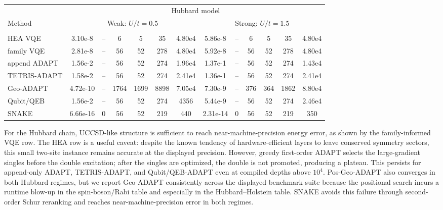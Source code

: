 \documentclass[
  reprint,
  amsmath,
  amssymb,
  aps,
  pra,
  nofootinbib,
  superscriptaddress,
  floatfix
]{revtex4-2}
\newcommand{\metrichead}[1]{\makebox[0.061\textwidth][c]{#1}}
\begin{document}
\begin{widetext}
\begin{minipage}{\textwidth}
\begin{center}
\footnotesize
\setlength{\tabcolsep}{1.15pt}
\renewcommand{\arraystretch}{1.08}
\begin{ruledtabular}
\begin{tabular}{p{}cccccc|cccccc}
& \multicolumn{12}{c}{Hubbard model}\\
\cline{2-13}
Method & \multicolumn{6}{c|}{Weak: $U/t=0.5$} & \multicolumn{6}{c}{Strong: $U/t=1.5$}\\
\cline{2-7}\cline{8-13}
 & \metrichead{$|\Delta E|$} & \metrichead{$1-F$} & \metrichead{$N_{2q}$} & \metrichead{$D_{2q}$} & \metrichead{$D_c$} & \metrichead{$S$} & \metrichead{$|\Delta E|$} & \metrichead{$1-F$} & \metrichead{$N_{2q}$} & \metrichead{$D_{2q}$} & \metrichead{$D_c$} & \metrichead{$S$}\\
\colrule
HEA VQE & 3.10e-8 & -- & 6 & 5 & 35 & 4.80e4 & 5.86e-8 & -- & 6 & 5 & 35 & 4.80e4\\
family VQE & 2.81e-8 & -- & 56 & 52 & 278 & 4.80e4 & 5.92e-8 & -- & 56 & 52 & 278 & 4.80e4\\
append ADAPT & 1.56e-2 & -- & 56 & 52 & 274 & 1.96e4 & 1.37e-1 & -- & 56 & 52 & 274 & 1.43e4\\
TETRIS-ADAPT & 1.58e-2 & -- & 56 & 52 & 274 & 2.41e4 & 1.36e-1 & -- & 56 & 52 & 274 & 2.41e4\\
Geo-ADAPT & 4.72e-10 & -- & 1764 & 1699 & 8898 & 7.05e4 & 7.30e-9 & -- & 376 & 364 & 1862 & 8.80e4\\
Qubit/QEB & 1.56e-2 & -- & 56 & 52 & 274 & 4356 & 5.44e-9 & -- & 56 & 52 & 274 & 2.46e4\\
SNAKE & 6.66e-16 & 0 & 56 & 52 & 219 & 440 & 2.31e-14 & 0 & 56 & 52 & 219 & 350\\
\end{tabular}
\end{ruledtabular}
\end{center}
\end{minipage}
\par\addvspace{1.0ex}
For the Hubbard chain, UCCSD-like structure is sufficient to reach near-machine-precision energy error, as shown by the family-informed VQE row. The HEA row is a useful caveat: despite the known tendency of hardware-efficient layers to leave conserved symmetry sectors, this small two-site instance remains accurate at the displayed precision. However, greedy first-order ADAPT selects the large-gradient singles before the double excitation; after the singles are optimized, the double is not promoted, producing a plateau. This persists for append-only ADAPT, TETRIS-ADAPT, and Qubit/QEB-ADAPT even at compiled depths above \(10^4\). Pos-Geo-ADAPT also converges in both Hubbard regimes, but we report Geo-ADAPT consistently across the displayed benchmark suite because the positional search incurs a runtime blow-up in the spin-boson/Rabi table and especially in the Hubbard--Holstein table. SNAKE avoids this failure through second-order Schur reranking and reaches near-machine-precision error in both regimes.


\end{widetext}
\end{document}
